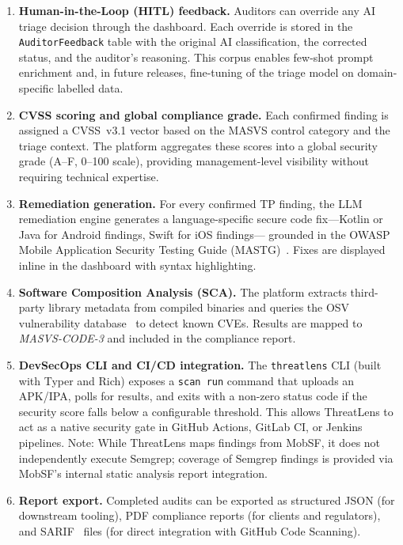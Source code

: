 \documentclass[preprint,12pt,a4paper]{elsarticle}
\begin{document}
\begin{enumerate}
  \item \textbf{Human-in-the-Loop (HITL) feedback.} Auditors can override
    any AI triage decision through the dashboard. Each override is stored in
    the \texttt{AuditorFeedback} table with the original AI classification,
    the corrected status, and the auditor's reasoning. This corpus enables
    few-shot prompt enrichment and, in future releases, fine-tuning of the
    triage model on domain-specific labelled data.

  \item \textbf{CVSS scoring and global compliance grade.} Each confirmed
    finding is assigned a CVSS~v3.1 vector based on the MASVS control
    category and the triage context. The platform aggregates these scores
    into a global security grade (A--F, 0--100 scale), providing
    management-level visibility without requiring technical expertise.

  \item \textbf{Remediation generation.} For every confirmed TP finding,
    the LLM remediation engine generates a language-specific secure code
    fix---Kotlin or Java for Android findings, Swift for iOS findings---
    grounded in the OWASP Mobile Application Security Testing Guide
    (MASTG)~\cite{mastg}. Fixes are displayed inline in the dashboard with
    syntax highlighting.

  \item \textbf{Software Composition Analysis (SCA).} The platform
    extracts third-party library metadata from compiled binaries and queries
    the OSV vulnerability database~\cite{osv_api} to detect known CVEs.
    Results are mapped to \textit{MASVS-CODE-3} and included in the
    compliance report.

  \item \textbf{DevSecOps CLI and CI/CD integration.} The \texttt{threatlens} CLI (built with Typer and Rich) exposes a \texttt{scan run} command that uploads an APK/IPA, polls for results, and exits with a non-zero status code if the security score falls below a configurable threshold. This allows ThreatLens to act as a native security gate in GitHub Actions, GitLab CI, or Jenkins pipelines. Note: While ThreatLens maps findings from MobSF, it does not independently execute Semgrep; coverage of Semgrep findings is provided via MobSF's internal static analysis report integration.

  \item \textbf{Report export.} Completed audits can be exported as
    structured JSON (for downstream tooling), PDF compliance reports (for
    clients and regulators), and SARIF~\cite{sarif} files (for direct
    integration with GitHub Code Scanning).
\end{enumerate}
\end{document}
